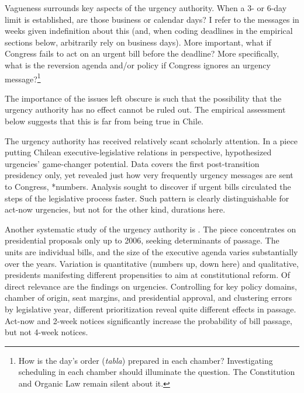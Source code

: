 \documentclass[letter,12pt]{article}
\begin{document}
Vagueness surrounds key aspects of the urgency authority. When a 3- or 6-day limit is established, are those business or calendar days? I refer to the messages in weeks given indefinition about this (and, when coding deadlines in the empirical sections below, arbitrarily rely on business days). More important, what if Congress fails to act on an urgent bill before the deadline? More specifically, what is the reversion agenda and/or policy if Congress ignores an urgency message?\footnote{How is the day's order (\emph{tabla}) prepared in each chamber? Investigating scheduling in each chamber should illuminate the question. The Constitution and Organic Law remain silent about it.} 

The importance of the issues left obscure is such that the possibility that the urgency authority has no effect cannot be ruled out. The empirical assessment below suggests that this is far from being true in Chile. 


The urgency authority has received relatively scant scholarly attention. In a piece putting Chilean executive-legislative relations in perspective, \citet{siavelis.2002} hypothesized urgencies' game-changer potential. Data covers the first post-transition presidency only, yet revealed just how very frequently urgency messages are sent to Congress, *numbers. Analysis sought to discover if urgent bills circulated the steps of the legislative process faster. Such pattern is clearly distinguishable for act-now urgencies, but not for the other kind, durations here. 

Another systematic study of the urgency authority is \citet{aleman.navia.UrgChi.2009}. The piece concentrates on presidential proposals only up to 2006, seeking determinants of passage. The units are individual bills, and the size of the executive agenda varies substantially over the years. Variation is quantitative (numbers up, down here) and qualitative, presidents manifesting different propensities to aim at constitutional reform. Of direct relevance are the findings on urgencies. Controlling for key policy domains, chamber of origin, seat margins, and presidential approval, and clustering errors by legislative year, different prioritization reveal quite different effects in passage. Act-now and 2-week notices significantly increase the probability of bill passage, but not 4-week notices. 
\end{document}
